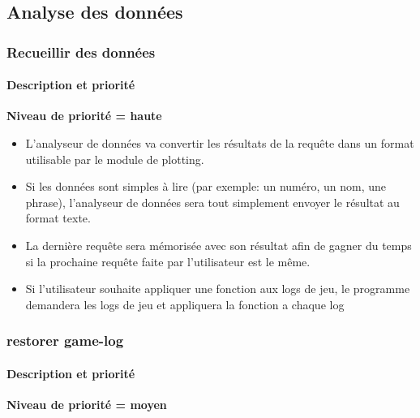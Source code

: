 \subsection{Analyse des données}
\subsubsection{Recueillir des données}
\paragraph*{Description et priorité}
\textbf{Niveau de priorité = haute}\\
\begin{itemize}

\item L'analyseur de données va convertir les résultats de la requête dans un format utilisable par le module de plotting.
\item Si les données sont simples à lire (par exemple: un numéro, un nom, une phrase), l'analyseur de données sera tout simplement envoyer le résultat au format texte.
\item La dernière requête sera mémorisée avec son résultat afin de gagner du temps si la prochaine requête faite par l'utilisateur est le même.
\item Si l'utilisateur souhaite appliquer une fonction aux logs de jeu, le programme demandera les logs de jeu et appliquera la fonction a chaque log
\end{itemize}

\subsubsection{restorer game-log}
\paragraph*{Description et priorité}
\textbf{Niveau de priorité = moyen}\\

